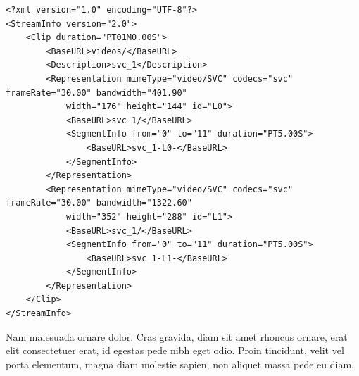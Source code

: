 \begin{minipage}[c]{0.95\textwidth}
\begin{center}
\begin{spacing}{0.5}
\begin{lstlisting}[frame=lines,style=XML,caption={Example of a MPD file.},label=mpd]
<?xml version="1.0" encoding="UTF-8"?>
<StreamInfo version="2.0">
    <Clip duration="PT01M0.00S">
        <BaseURL>videos/</BaseURL>
        <Description>svc_1</Description>
        <Representation mimeType="video/SVC" codecs="svc" frameRate="30.00" bandwidth="401.90"
            width="176" height="144" id="L0">
            <BaseURL>svc_1/</BaseURL>
            <SegmentInfo from="0" to="11" duration="PT5.00S">
                <BaseURL>svc_1-L0-</BaseURL>
            </SegmentInfo>
        </Representation>
        <Representation mimeType="video/SVC" codecs="svc" frameRate="30.00" bandwidth="1322.60"
            width="352" height="288" id="L1">
            <BaseURL>svc_1/</BaseURL>
            <SegmentInfo from="0" to="11" duration="PT5.00S">
                <BaseURL>svc_1-L1-</BaseURL>
            </SegmentInfo>
        </Representation>
    </Clip>
</StreamInfo>
\end{lstlisting}
\end{spacing}
\end{center}
\end{minipage}

Nam malesuada ornare dolor. Cras gravida, diam sit amet rhoncus ornare, erat elit consectetuer erat, id egestas pede nibh eget odio. Proin tincidunt, velit vel porta elementum, magna diam molestie sapien, non aliquet massa pede eu diam.